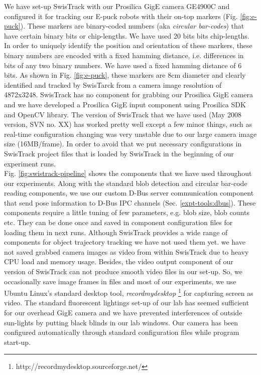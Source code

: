 We have set-up SwisTrack with our Prosilica GigE camera GE4900C and configured it for tracking our E-puck robots with their on-top markers (Fig. \ref{fig:e-puck}). These markers are binary-coded numbers (aka {\em circular bar-codes}) that have certain binary bits or chip-lengths. We have used 20 bits bits chip-lengths. In order to uniquely identify the position and orientation of these markers, these binary numbers are encoded with a fixed hamming distance, i.e. differences in bits of any two binary numbers. We have used a fixed hamming distance of 6 bits. As shown in Fig. \ref{fig:e-puck}, these markers are 8cm diameter and clearly identified and tracked by SwisTarck from a camera image resolution of 4872x3248. SwisTrack has no component for grabbing our Prosilica GigE camera and we have developed a Prosilica GigE input component using Prosilica SDK and OpenCV library. The version of SwisTrack that we have used (May 2008 version, SVN no. XX) has worked pretty well except a few minor things, such as real-time configuration changing was very unstable due to our large camera image size (16MB/frame). In order to avoid that we put necessary configurations in SwisTrack project files that is loaded by SwisTrack in the beginning of our experiment runs.\\
Fig. \ref{fig:swistrack-pipeline} shows the components that we have used throughout our experiments. Along with the standard blob detection and circular bar-code reading components, we use our custom D-Bus server communication component that send pose information to D-Bus IPC channels (Sec. \ref{expt-tools:dbus}). These components require a little tuning of few parameters, e.g. blob size, blob counts etc. They can be done once and saved in component configuration files for loading them in next runs. Although SwisTrack provides a wide range of components for object trajectory tracking we have not used them yet. we have not saved grabbed camera images as video from within SwisTrack due to heavy CPU load and memory usage. Besides, the video output component of our version of SwisTrack can not produce smooth video files in our set-up. So, we occasionally save image frames in files and most of our experiments, we use Ubuntu Linux's standard desktop  tool, {\em recordmydesktop} \footnote{http://recordmydesktop.sourceforge.net/} for capturing screen as video. The standard fluorescent lightings set-up of our lab has seemed sufficient for our overhead GigE camera and we have prevented interferences of outside sun-lights by putting black blinds in our lab windows. Our camera has been configured automatically through standard configuration files while program start-up.
